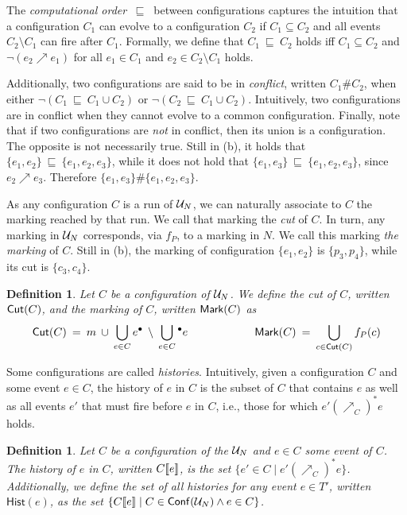 \documentclass[11pt,a4paper]{article}
\newtheorem{definition}[theorem]{Definition}
\newcommand{\hist}[1]{\ensuremath{\mathsf{Hist}(#1)}}
\newcommand{\conf}[1]{\ensuremath{\mathsf{Conf}(#1)}}
\newcommand{\confl}{\ensuremath{\mathord{\#}}}
\newcommand{\evolves}{{\ensuremath{\ \sqsubseteq \ }}}
\begin{document}
\label{pag:evolves} The \emph{computational order} $\evolves$ between
configurations captures the intuition that a configuration $C_1$ can evolve to
a configuration $C_2$ if $C_1 \subseteq C_2$ and all events $C_2 \setminus C_1$
can fire after $C_1$.  Formally, we define that $C_1 \evolves C_2$ holds
iff $C_1 \subseteq C_2$ and $\lnot (e_2 \nearrow e_1)$ for all $e_1 \in C_1$
and $e_2 \in C_2 \setminus C_1$ holds.

\label{pag:conflict} Additionally, two configurations are said to be in
\emph{conflict}, written $C_1 \confl C_2$, when either $\lnot (C_1 \evolves C_1
\cup C_2)$ or $\lnot (C_2 \evolves C_1 \cup C_2)$.  Intuitively, two
configurations are in conflict when they cannot evolve to a common
configuration.  Finally, note that if two configurations are \emph{not} in
conflict, then its union is a configuration.  The opposite is not necessarily
true.  Still in  (b), it holds that $\{e_1, e_2\} \evolves \{e_1,
e_2, e_3\}$, while it does not hold that $\{e_1, e_3\} \evolves \{e_1, e_2,
e_3\}$, since $e_2 \nearrow e_3$.  Therefore $\{e_1, e_3\} \confl \{e_1, e_2,
e_3\}$.

As any configuration $C$ is a run of $\mathcal{U}_{N}$, we can naturally associate to
$C$ the marking reached by that run.  We call that marking the \emph{cut} of
$C$.  In turn, any marking in $\mathcal{U}_{N}$ corresponds, via $f_P$, to a marking in
$N$.  We call this marking \emph{the marking} of $C$.  Still in 
(b), the marking of configuration $\{e_1, e_2\}$ is $\{p_3, p_4\}$, while its
cut is $\{c_3, c_4\}$.

\begin{definition}
Let $C$ be a configuration of $\mathcal{U}_{N}$.  We define
the \emph{cut} of $C$, written $\mathsf{Cut }{(C)}$, and the \emph{marking} of $C$, written
$\mathsf{Mark }{(C)}$ as $$\mathsf{Cut }{(C)} \: = \: m \: \cup \: \bigcup_{e \in C} e^\bullet \:
\setminus \: \bigcup_{e \in C} {}^\bullet e \qquad \qquad \qquad \mathsf{Mark }{(C)} \: = \:
\bigcup_{c \in \mathsf{Cut }{(C)}} f_P (c)$$
\end{definition}

Some configurations are called \emph{histories}.  Intuitively, given a
configuration $C$ and some event $e \in C$, the history of $e$ in $C$ is the
subset of $C$ that contains $e$ as well as all events $e'$ that must fire
before $e$ in $C$, i.e., those for which $e' (\nearrow_C)^* e$ holds.

\begin{definition}
\label{def:history}
Let $C$ be a configuration of the $\mathcal{U}_{N}$ and $e \in C$ some event of $C$.
The \emph{history} of $e$ in $C$, written $C [\![ e]\!]$, is the set $\{e' \in C
\mid e' (\nearrow_C)^* e\}$.  Additionally, we define the set of all histories
for any event $e \in T'$, written $\hist e$, as the set $\{C \sem e \mid C \in
\conf{\unf N} \land e \in C\}$.
\end{definition}
\end{document}
